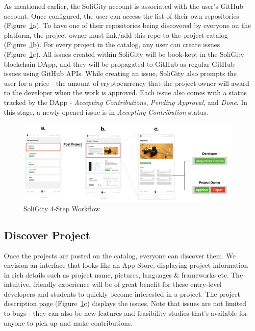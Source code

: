 \documentclass[12pt]{article}
\renewcommand{\_}{\kern-1.5pt\textunderscore\kern-1.5pt}
\begin{document}
As mentioned earlier, the SoliGity account is associated with the user’s GitHub account. Once configured, the user
can access the list of their own repositories (Figure~\ref{fig:workflow2}a). To have one of their repositories
being discovered by everyone on the platform, the project owner must link/add this repo to the project catalog
(Figure~\ref{fig:workflow2}b). For every project in the catalog, any user can create issues (Figure~\ref{fig:workflow2}c).
All issues created within SoliGity will be book-kept in the SoliGity blockchain DApp, and they will be propagated
to GitHub as regular GitHub issues using GitHub APIs. While creating an issue, SoliGity also prompts the user for
a price - the amount of cryptocurrency that the project owner will award to the developer when the work is approved.
Each issue also comes with a status tracked by the DApp - \textit{Accepting Contributions}, \textit{Pending Approval},
and \textit{Done}. In this stage, a newly-opened issue is in \textit{Accepting Contribution} status.


\begin{figure}[H]
	\centering
	\includegraphics[width=16.5cm]{graphs/00b. workflow.png}
	\caption{SoliGity 4-Step Workflow}
	\label{fig:workflow2}
\end{figure}

\subsection{Discover Project}

Once the projects are posted on the catalog, everyone can discover them. We envision an interface that looks
like an App Store, displaying project information in rich details such as project name, pictures, languages \&
frameworks etc. The intuitive, friendly experience will be of great benefit for these entry-level developers
and students to quickly become interested in a project. The project description page (Figure~\ref{fig:workflow2}c)
displays the issues. Note that issues are not limited to bugs - they can also be new features and feasibility
studies that’s available for anyone to pick up and make contributions.
\end{document}
